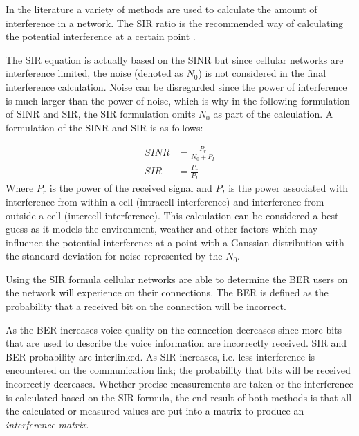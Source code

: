 In the literature a variety of methods are used to calculate the amount of interference in a network. The \gls{SIR} ratio is the recommended way of calculating the potential interference at a certain point \cite{Karen2004}. 

The \gls{SIR} equation is actually based on the \gls{SINR} but since cellular networks are interference limited, the noise (denoted as $N_0$) is not considered in the final interference calculation\cite{WirelessCommunications}. Noise can be disregarded since the power of interference is much larger than the power of noise, which is why in the following formulation of \gls{SINR} and \gls{SIR}, the \gls{SIR} formulation omits $N_0$ as part of the calculation\cite{WirelessDigitalCommunications}.
A formulation of the \gls{SINR} and \gls{SIR} is as follows:

\begin{align}
	SINR &= \frac{P_r}{N_0 + P_I}\\
	SIR &= \frac{P_r}{P_I}
\end{align}
Where $P_r$ is the power of the received signal and $P_I$ is the power associated with interference from within a cell (intracell interference) and interference from outside a cell (intercell interference)\cite{WirelessCommunications}.
This calculation can be considered a best guess as it models the environment, weather and other factors which may influence the potential interference at a point with a Gaussian distribution with the standard deviation for noise represented by the $N_0$\cite{Karen2004}.

Using the \gls{SIR} formula cellular networks are able to determine the \gls{BER} users on the network will experience on their connections\cite{WirelessDigitalCommunications}. The \gls{BER} is defined as the probability that a received bit on the connection will be incorrect\cite{MobileWirelessCommunications}. 

As the \gls{BER} increases voice quality on the connection decreases since more bits that are used to describe the voice information are incorrectly received\cite{WirelessDigitalCommunications}. \gls{SIR} and \gls{BER} probability are interlinked. As \gls{SIR} increases, i.e. less interference is encountered on the communication link; the probability that bits will be received incorrectly decreases\cite{WirelessDigitalCommunications}.
Whether precise measurements are taken or the interference is calculated based on the \gls{SIR} formula, the end result of both methods is that all the calculated or measured values are put into a matrix to produce an \emph{interference matrix}\cite{ACOvsEA}.

